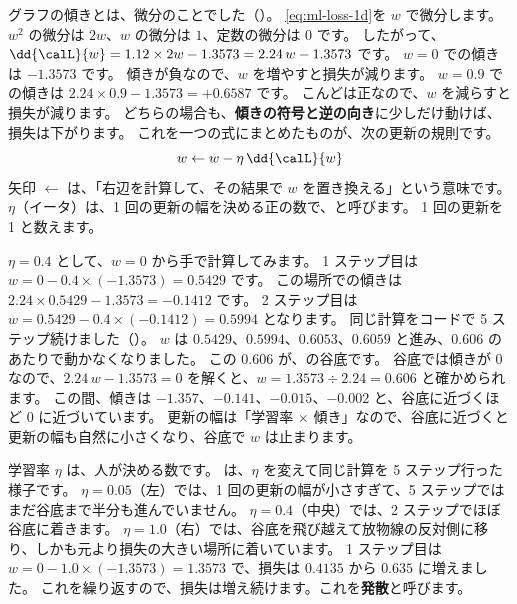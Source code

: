 グラフの傾きとは、微分のことでした（）。
\eqref{eq:ml-loss-1d}を $w$ で微分します。
$w^2$ の微分は $2w$、$w$ の微分は $1$、定数の微分は $0$ です。
したがって、$\dd{\calL}{w} = 1.12\times 2w - 1.3573 = 2.24\,w - 1.3573$ です。
$w=0$ での傾きは $-1.3573$ です。
傾きが負なので、$w$ を増やすと損失が減ります。
$w=0.9$ での傾きは $2.24\times 0.9 - 1.3573 = +0.6587$ です。
こんどは正なので、$w$ を減らすと損失が減ります。
どちらの場合も、\textbf{傾きの符号と逆の向き}に少しだけ動けば、損失は下がります。
これを一つの式にまとめたものが、次の更新の規則です。
\begin{equation}
w \leftarrow w - \eta\,\dd{\calL}{w}
\label{eq:ml-gd-1d}
\end{equation}
矢印 $\leftarrow$ は、「右辺を計算して、その結果で $w$ を置き換える」という意味です。
$\eta$（イータ）は、1 回の更新の幅を決める正の数で、と呼びます。
1 回の更新を 1 と数えます。

$\eta=0.4$ として、$w=0$ から手で計算してみます。
1 ステップ目は $w = 0 - 0.4\times(-1.3573) = 0.5429$ です。
この場所での傾きは $2.24\times 0.5429 - 1.3573 = -0.1412$ です。
2 ステップ目は $w = 0.5429 - 0.4\times(-0.1412) = 0.5994$ となります。
同じ計算をコードで 5 ステップ続けました（）。
$w$ は $0.5429$、$0.5994$、$0.6053$、$0.6059$ と進み、$0.606$ のあたりで動かなくなりました。
この $0.606$ が、の谷底です。
谷底では傾きが 0 なので、$2.24\,w - 1.3573 = 0$ を解くと、$w = 1.3573\div 2.24 = 0.606$ と確かめられます。
この間、傾きは $-1.357$、$-0.141$、$-0.015$、$-0.002$ と、谷底に近づくほど 0 に近づいています。
更新の幅は「学習率 $\times$ 傾き」なので、谷底に近づくと更新の幅も自然に小さくなり、谷底で $w$ は止まります。

学習率 $\eta$ は、人が決める数です。
は、$\eta$ を変えて同じ計算を 5 ステップ行った様子です。
$\eta=0.05$（左）では、1 回の更新の幅が小さすぎて、5 ステップではまだ谷底まで半分も進んでいません。
$\eta=0.4$（中央）では、2 ステップでほぼ谷底に着きます。
$\eta=1.0$（右）では、谷底を飛び越えて放物線の反対側に移り、しかも元より損失の大きい場所に着いています。
1 ステップ目は $w = 0 - 1.0\times(-1.3573) = 1.3573$ で、損失は $0.4135$ から $0.635$ に増えました。
これを繰り返すので、損失は増え続けます。これを\textbf{発散}と呼びます。

